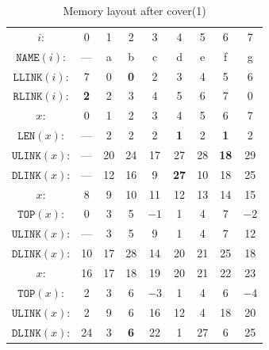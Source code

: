 \documentclass[a4paper,landscape,11pt]{article}
\begin{document}
\begin{table}
	\begin{center}
		\caption{Memory layout after cover(1)}
		\begin{tabular}{c c c c c c c c c }
			\hline
			$i$:                 & 0          & 1  & 2          & 3          & 4           & 5  & 6           & 7    \\
			$\texttt{NAME}(i)$:  & ---        & a  & b          & c          & d           & e  & f           & g    \\
			$\texttt{LLINK}(i)$: & 7          & 0  & \textbf{0} & 2          & 3           & 4  & 5           & 6    \\
			$\texttt{RLINK}(i)$: & \textbf{2} & 2  & 3          & 4          & 5           & 6  & 7           & 0    \\
			\hline
			$x$:                 & 0          & 1  & 2          & 3          & 4           & 5  & 6           & 7    \\
			$\texttt{LEN}(x)$:   & ---        & 2  & 2          & 2          & \textbf{1}  & 2  & \textbf{1}  & 2    \\
			$\texttt{ULINK}(x)$: & ---        & 20 & 24         & 17         & 27          & 28 & \textbf{18} & 29   \\
			$\texttt{DLINK}(x)$: & ---        & 12 & 16         & 9          & \textbf{27} & 10 & 18          & 25   \\
			\hline
			$x$:                 & 8          & 9  & 10         & 11         & 12          & 13 & 14          & 15   \\
			$\texttt{TOP}(x)$:   & 0          & 3  & 5          & $-1$       & 1           & 4  & 7           & $-2$ \\
			$\texttt{ULINK}(x)$: & ---        & 3  & 5          & 9          & 1           & 4  & 7           & 12   \\
			$\texttt{DLINK}(x)$: & 10         & 17 & 28         & 14         & 20          & 21 & 25          & 18   \\
			\hline
			$x$:                 & 16         & 17 & 18         & 19         & 20          & 21 & 22          & 23   \\
			$\texttt{TOP}(x)$:   & 2          & 3  & 6          & $-3$       & 1           & 4  & 6           & $-4$ \\
			$\texttt{ULINK}(x)$: & 2          & 9  & 6          & 16         & 12          & 4  & 18          & 20   \\
			$\texttt{DLINK}(x)$: & 24         & 3  & \textbf{6} & 22         & 1           & 27 & 6           & 25   \\

\end{tabular}
\end{center}
\end{table}
\end{document}
